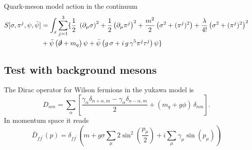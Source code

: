 Quark-meson model action in the continuum
\begin{align*}
    S[\sigma, \pi^j, \psi, \bar\psi] & = \int_x \sum_{j=1}^3 \{ \frac{1}{2} \ \left(\partial_\mu \sigma\right)^2 + \frac{1}{2} \left(\partial_\mu \pi^j \right)^2 + \frac{m^2}{2} \left(\sigma^2 + (\pi^j)^2\right) + \frac{\lambda}{4!} \left(\sigma^2 + (\pi^j)^2\right)^2 \\ 
    & + \bar \psi \left( \slashed{\partial} + m_q \right) \psi + \bar \psi \left(g \, \sigma + i \, g \,\gamma^5 \pi^j \tau^j\right) \psi \}
\end{align*}




\subsection{Test with background mesons}
The Dirac operator for Wilson fermions in the yukawa model is
\begin{equation*}
D_{n m}=\sum_\alpha\left[\frac{\gamma_\alpha \delta_{n+\alpha, m} - \gamma_\alpha \delta_{n-\alpha, m}}{2} + (m_q + g \phi) \, \delta_{n m}\right] .
\end{equation*}
In momentum space it reads
\begin{equation*}
\bar{D}_{f f^{\prime}}(p)=\delta_{f f^{\prime}}\left(m+ g \sigma \sum_\mu 2 \sin ^2\left(\frac{p_\mu}{2}\right)+i \sum_\mu \gamma_\mu \sin \left(p_\mu\right)\right)
\end{equation*}
